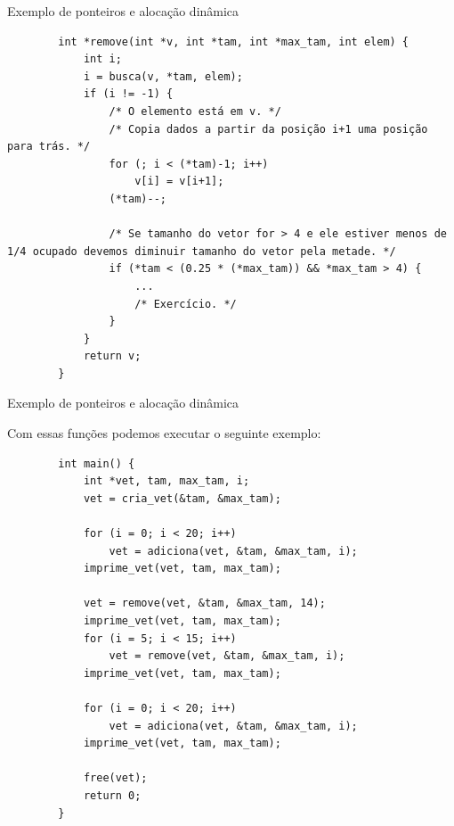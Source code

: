 \documentclass[handout]{beamer}
\begin{document}
\begin{frame}[fragile]{Exemplo de ponteiros e alocação dinâmica}

    \begin{verbatim}
        int *remove(int *v, int *tam, int *max_tam, int elem) {
            int i;
            i = busca(v, *tam, elem);
            if (i != -1) {
                /* O elemento está em v. */
                /* Copia dados a partir da posição i+1 uma posição para trás. */
                for (; i < (*tam)-1; i++)
                    v[i] = v[i+1];
                (*tam)--;

                /* Se tamanho do vetor for > 4 e ele estiver menos de 1/4 ocupado devemos diminuir tamanho do vetor pela metade. */
                if (*tam < (0.25 * (*max_tam)) && *max_tam > 4) {
                    ...
                    /* Exercício. */
                } 
            }
            return v;
        }
    \end{verbatim}

\end{frame}

\begin{frame}[fragile]{Exemplo de ponteiros e alocação dinâmica}

    Com essas funções podemos executar o seguinte exemplo:
    \vspace{-0.3cm}
    \begin{verbatim}
        int main() {
            int *vet, tam, max_tam, i;
            vet = cria_vet(&tam, &max_tam);
            
            for (i = 0; i < 20; i++)
                vet = adiciona(vet, &tam, &max_tam, i);
            imprime_vet(vet, tam, max_tam);

            vet = remove(vet, &tam, &max_tam, 14);
            imprime_vet(vet, tam, max_tam);
            for (i = 5; i < 15; i++)
                vet = remove(vet, &tam, &max_tam, i);
            imprime_vet(vet, tam, max_tam);

            for (i = 0; i < 20; i++)
                vet = adiciona(vet, &tam, &max_tam, i);
            imprime_vet(vet, tam, max_tam);
            
            free(vet);
            return 0;
        }
    \end{verbatim}

\end{frame}
\end{document}
